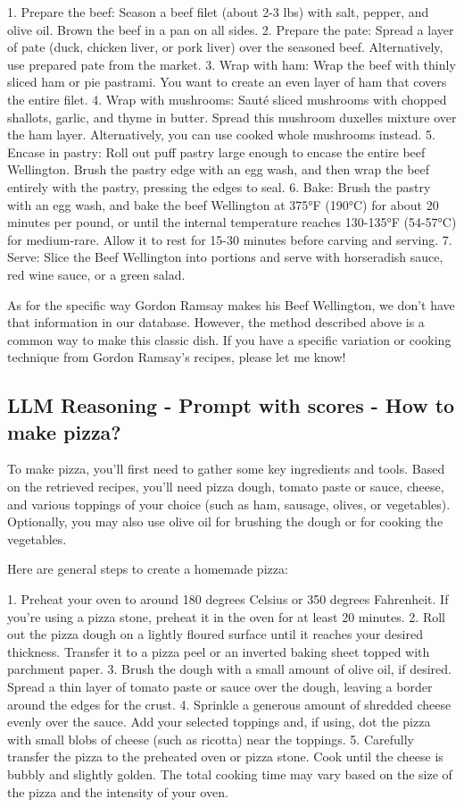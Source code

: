 \documentclass[a4paper,11pt]{article}
\begin{document}
1. Prepare the beef: Season a beef filet (about 2-3 lbs) with salt, pepper, and olive oil. Brown the beef in a pan on all sides.
2. Prepare the pate: Spread a layer of pate (duck, chicken liver, or pork liver) over the seasoned beef. Alternatively, use prepared pate from the market.
3. Wrap with ham: Wrap the beef with thinly sliced ham or pie pastrami. You want to create an even layer of ham that covers the entire filet.
4. Wrap with mushrooms: Sauté sliced mushrooms with chopped shallots, garlic, and thyme in butter. Spread this mushroom duxelles mixture over the ham layer. Alternatively, you can use cooked whole mushrooms instead.
5. Encase in pastry: Roll out puff pastry large enough to encase the entire beef Wellington. Brush the pastry edge with an egg wash, and then wrap the beef entirely with the pastry, pressing the edges to seal.
6. Bake: Brush the pastry with an egg wash, and bake the beef Wellington at 375°F (190°C) for about 20 minutes per pound, or until the internal temperature reaches 130-135°F (54-57°C) for medium-rare. Allow it to rest for 15-30 minutes before carving and serving.
7. Serve: Slice the Beef Wellington into portions and serve with horseradish sauce, red wine sauce, or a green salad.

As for the specific way Gordon Ramsay makes his Beef Wellington, we don't have that information in our database. However, the method described above is a common way to make this classic dish. If you have a specific variation or cooking technique from Gordon Ramsay's recipes, please let me know!
\subsection{LLM Reasoning - Prompt with scores - How to make pizza?}
To make pizza, you'll first need to gather some key ingredients and tools. Based on the retrieved recipes, you'll need pizza dough, tomato paste or sauce, cheese, and various toppings of your choice (such as ham, sausage, olives, or vegetables). Optionally, you may also use olive oil for brushing the dough or for cooking the vegetables.

Here are general steps to create a homemade pizza:

1. Preheat your oven to around 180 degrees Celsius or 350 degrees Fahrenheit. If you're using a pizza stone, preheat it in the oven for at least 20 minutes.
2. Roll out the pizza dough on a lightly floured surface until it reaches your desired thickness. Transfer it to a pizza peel or an inverted baking sheet topped with parchment paper.
3. Brush the dough with a small amount of olive oil, if desired. Spread a thin layer of tomato paste or sauce over the dough, leaving a border around the edges for the crust.
4. Sprinkle a generous amount of shredded cheese evenly over the sauce. Add your selected toppings and, if using, dot the pizza with small blobs of cheese (such as ricotta) near the toppings.
5. Carefully transfer the pizza to the preheated oven or pizza stone. Cook until the cheese is bubbly and slightly golden. The total cooking time may vary based on the size of the pizza and the intensity of your oven.
\end{document}
